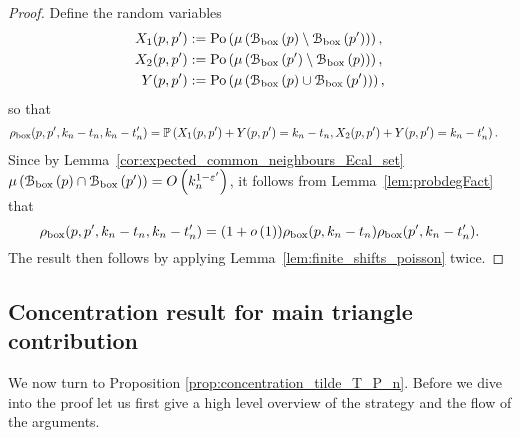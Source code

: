 \begin{proof}
Define the random variables
\begin{align*}
	X_1(p,p^\prime) &:= {\mathrm{Po}}\left(\mu\left({\mathcal B}_{\text{box}}\left(p\right)\setminus {\mathcal B}_{\text{box}}\left(p^\prime\right)\right)\right),\\
	X_2(p,p^\prime) &:= {\mathrm{Po}}\left(\mu\left({\mathcal B}_{\text{box}}\left(p^\prime\right)\setminus {\mathcal B}_{\text{box}}\left(p\right)\right)\right),\\
	Y(p,p^\prime) &:= {\mathrm{Po}}\left(\mu\left({\mathcal B}_{\text{box}}\left(p\right) \cup {\mathcal B}_{\text{box}}\left(p^\prime\right)\right)\right),
\end{align*}
so that
\begin{align*}
	\rho_{\text{box}}(p,p^\prime,k_n-t_n,k_n-t_n^\prime) &= \mathbb{P}\left(X_1(p,p^\prime) + Y(p,p^\prime) = k_n-t_n, X_2(p,p^\prime) + Y(p,p^\prime) = k_n - t_n^\prime\right).
\end{align*}
Since by Lemma~\ref{cor:expected_common_neighbours_Ecal_set} $\mu\left({\mathcal B}_{\text{box}}\left(p\right) \cap {\mathcal B}_{\text{box}}\left(p^\prime\right)\right) = O\left(k_n^{1-\varepsilon^\prime}\right)$, it follows from Lemma~\ref{lem:probdegFact} that
\[
	\rho_{\text{box}}(p,p^\prime,k_n-t_n,k_n-t_n^\prime) = (1+o\left(1\right))\rho_{\text{box}}(p,k_n-t_n)\rho_{\text{box}}(p^\prime,k_n-t_n^\prime).
\]
The result then follows by applying Lemma~\ref{lem:finite_shifts_poisson} twice.
\end{proof}

\subsection{Concentration result for main triangle contribution}\label{ssec:concentration_tilde_T}

We now turn to Proposition \ref{prop:concentration_tilde_T_P_n}. Before we dive into the proof let us first give a high level overview of the strategy and the flow of the arguments. 

